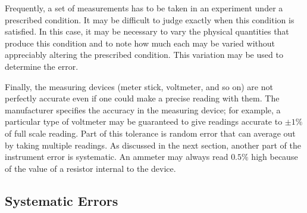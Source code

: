 
Frequently, a set of measurements has to be taken in an experiment under a prescribed condition. It may be difficult to judge exactly when this condition is satisfied. In this case, it may be necessary to vary the physical quantities that produce this condition and to note how much each may be varied without appreciably altering the prescribed condition. This variation may be used to determine the error.

Finally, the measuring devices (meter stick, voltmeter, and so on) are not perfectly accurate even if one could make a precise reading with them. The manufacturer specifies the accuracy in the measuring device; for example, a particular type of voltmeter may be guaranteed to give readings accurate to $\pm 1\%$ of full scale reading. Part of this tolerance is random error that can average out by taking multiple readings. As discussed in the next section, another part of the instrument error is systematic. An ammeter may always read $0.5\%$ high because of the value of a resistor internal to the device.

\subsection{Systematic Errors}
\label{sub:SystematicErrors}


